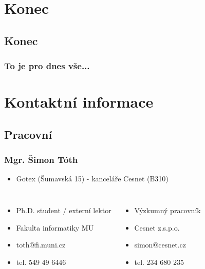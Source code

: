 \section*{Konec}
\subsection*{Konec}

\begin{frame}
	\frametitle{To je pro dnes vše...}
\end{frame}

\section*{Kontaktní informace}
	\subsection*{Pracovní}

\begin{frame}[label=kontakt-simontoth]
	\frametitle{Mgr. Šimon Tóth}
	\begin{itemize}
		\item{Gotex (Šumavská 15) - kanceláře Cesnet (B310)}
	\end{itemize}
	
	\begin{center}
	\begin{columns}

		\begin{itemize}
			\item{Ph.D. student / externí lektor}
			\item{Fakulta informatiky MU}
			\item{toth@fi.muni.cz}
			\item{tel. 549 49 6446}
		\end{itemize}

		\begin{itemize}
			\item{Výzkumný pracovník}
			\item{Cesnet z.s.p.o.}
			\item{simon@cesnet.cz}
			\item{tel. 234 680 235}
		\end{itemize}

	\end{columns}
	\end{center}

\end{frame}

%


